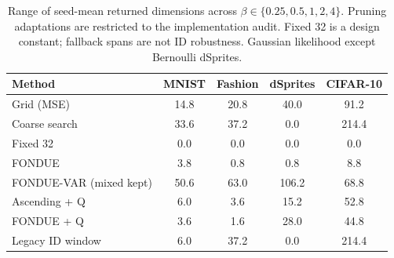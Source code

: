 \begin{table}[H]
\caption{Range of seed-mean returned dimensions across $\beta\in\{0.25,0.5,1,2,4\}$. Pruning adaptations are restricted to the implementation audit. Fixed 32 is a design constant; fallback spans are not ID robustness. Gaussian likelihood except Bernoulli dSprites.}\label{tab:span}
\small
\setlength{\tabcolsep}{3.5pt}
\begin{tabular*}{\textwidth}{@{\extracolsep{\fill}}lcccc@{}}
\toprule
Method & MNIST & Fashion & dSprites & CIFAR-10 \\
\midrule
Grid (MSE) & 14.8 & 20.8 & 40.0 & 91.2 \\
Coarse search & 33.6 & 37.2 & 0.0 & 214.4 \\
Fixed 32 & 0.0 & 0.0 & 0.0 & 0.0 \\
FONDUE & 3.8 & 0.8 & 0.8 & 8.8 \\
FONDUE-VAR (mixed kept) & 50.6 & 63.0 & 106.2 & 68.8 \\
Ascending + Q & 6.0 & 3.6 & 15.2 & 52.8 \\
FONDUE + Q & 3.6 & 1.6 & 28.0 & 44.8 \\
Legacy ID window & 6.0 & 37.2 & 0.0 & 214.4 \\
\bottomrule
\end{tabular*}
\end{table}
